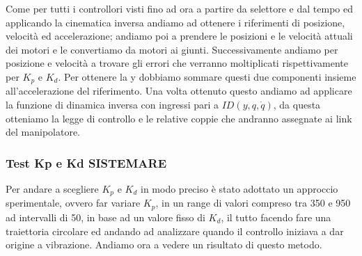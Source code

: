 Come per tutti i controllori visti fino ad ora a partire da selettore e dal tempo ed applicando la cinematica inversa  andiamo ad ottenere i riferimenti di posizione,  velocità ed accelerazione; andiamo poi a prendere le posizioni e le velocità attuali dei motori e le convertiamo da motori ai giunti. Successivamente andiamo per posizione e velocità a trovare gli errori che verranno moltiplicati rispettivamente per $K_p$ e $K_d$. Per ottenere la y dobbiamo sommare questi due componenti insieme all'accelerazione del riferimento. Una volta ottenuto questo andiamo ad applicare la funzione di dinamica inversa con ingressi pari a $ID(y,q,\dot{q})$, da questa otteniamo la legge di controllo e le relative coppie che andranno assegnate ai link del manipolatore. 
\subsubsection*{Test Kp e Kd SISTEMARE}
Per andare a scegliere $K_p$ e $K_d$ in modo preciso è stato adottato un approccio sperimentale, ovvero far variare $K_p$, in un range di valori compreso tra 350 e 950 ad intervalli di 50, in base ad un valore fisso di $K_d$, il tutto facendo fare una traiettoria circolare ed andando ad analizzare quando il controllo iniziava a dar origine a vibrazione. Andiamo ora a vedere un risultato di questo metodo.
